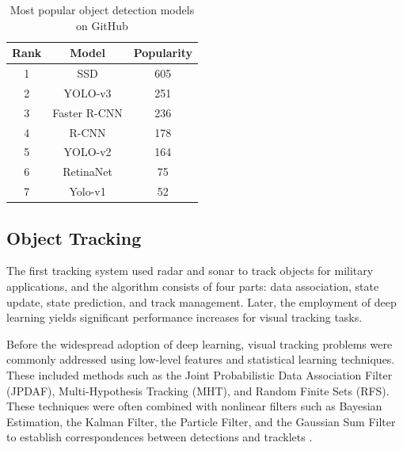 
\begin{table}[H]
\centering
\begin{tabular}{ ccc } 
\hline
Rank & Model & Popularity \\
\hline
1 & SSD & 605 \\ 
2 & YOLO-v3 & 251 \\ 
3 & Faster R-CNN & 236 \\ 
4 & R-CNN & 178 \\ 
5 & YOLO-v2 & 164 \\ 
6 & RetinaNet & 75 \\ 
7 & Yolo-v1 & 52 \\ 
\hline
\end{tabular}
\caption{Most popular object detection models on GitHub \citep{wang2021daedalus}}
\label{tab.detection_github}
\end{table}


\subsection{Object Tracking}

The first tracking system used radar and sonar to track objects for military applications, and the algorithm consists of four parts: data association, state update, state prediction, and track management. Later, the employment of deep learning yields significant performance increases for visual tracking tasks.

Before the widespread adoption of deep learning, visual tracking problems were commonly addressed using low-level features and statistical learning techniques. These included methods such as the Joint Probabilistic Data Association Filter (JPDAF), Multi-Hypothesis Tracking (MHT), and Random Finite Sets (RFS). These techniques were often combined with nonlinear filters such as Bayesian Estimation, the Kalman Filter, the Particle Filter, and the Gaussian Sum Filter to establish correspondences between detections and tracklets \citep{vo2015multitarget}. 


